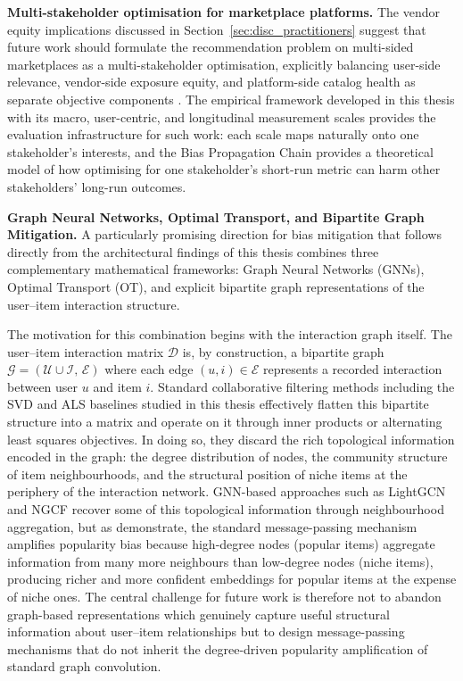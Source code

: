 \documentclass[11pt,a4paper]{report}
\begin{document}
\textbf{Multi-stakeholder optimisation for marketplace platforms.} The vendor equity implications discussed in Section~\ref{sec:disc_practitioners} suggest that future work should formulate the recommendation problem on multi-sided marketplaces as a multi-stakeholder optimisation, explicitly balancing user-side relevance, vendor-side exposure equity, and platform-side catalog health as separate objective components \citep{burke2017multisided, abdollahpouri2020multistakeholder}. The empirical framework developed in this thesis with its macro, user-centric, and longitudinal measurement scales provides the evaluation infrastructure for such work: each scale maps naturally onto one stakeholder's interests, and the Bias Propagation Chain provides a theoretical model of how optimising for one stakeholder's short-run metric can harm other stakeholders' long-run outcomes.

\textbf{Graph Neural Networks, Optimal Transport, and Bipartite Graph Mitigation.}
A particularly promising direction for bias mitigation that follows directly from the
architectural findings of this thesis combines three complementary mathematical
frameworks: Graph Neural Networks (GNNs), Optimal Transport (OT), and explicit
bipartite graph representations of the user--item interaction structure.

The motivation for this combination begins with the interaction graph itself.
The user--item interaction matrix $\mathcal{D}$ is, by construction, a bipartite
graph $\mathcal{G} = (\mathcal{U} \cup \mathcal{I},\, \mathcal{E})$ where each edge
$(u, i) \in \mathcal{E}$ represents a recorded interaction between user $u$ and item
$i$. Standard collaborative filtering methods including the SVD and ALS baselines
studied in this thesis effectively flatten this bipartite structure into a matrix
and operate on it through inner products or alternating least squares objectives.
In doing so, they discard the rich topological information encoded in the graph:
the degree distribution of nodes, the community structure of item neighbourhoods,
and the structural position of niche items at the periphery of the interaction
network. GNN-based approaches such as LightGCN \citep{he2020lightgcn} and NGCF
\citep{wang2019ngcf} recover some of this topological information through
neighbourhood aggregation, but as \citet{chen2024gcnamplifypopularity} demonstrate,
the standard message-passing mechanism amplifies popularity bias because high-degree
nodes (popular items) aggregate information from many more neighbours than low-degree
nodes (niche items), producing richer and more confident embeddings for popular items
at the expense of niche ones. The central challenge for future work is therefore not
to abandon graph-based representations which genuinely capture useful structural
information about user--item relationships but to design message-passing mechanisms
that do not inherit the degree-driven popularity amplification of standard graph
convolution.
\end{document}
